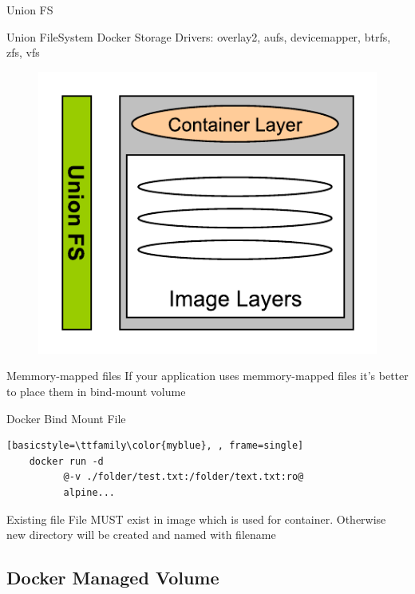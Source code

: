 \begin{frame}[fragile]{Union FS }    
  \begin{alertblock}{Union FileSystem}
  Docker Storage Drivers: overlay2, aufs, devicemapper, btrfs, zfs, vfs
  \end{alertblock}
  \begin{figure}
    \includegraphics[scale=0.5]{figures/unionfs.pdf}
  \end{figure}
  \begin{alertblock}{Memmory-mapped files}
  If your application uses memmory-mapped files it's better to place them in bind-mount volume
  \end{alertblock}
\end{frame}

\begin{frame}[fragile]{Docker Bind Mount File }
 \begin{lstlisting}[basicstyle=\ttfamily\color{myblue}, , frame=single]
    docker run -d  
          @-v ./folder/test.txt:/folder/text.txt:ro@
          alpine...
  \end{lstlisting}
  \begin{alertblock}{Existing file}
  File MUST exist in image which is used for container. Otherwise new directory will be created and named with filename
  \end{alertblock}
\end{frame}

\subsection{Docker Managed Volume}

